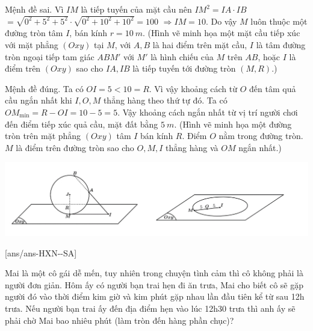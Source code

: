 \begin{ex}
{\begin{listEX}
        \item Mệnh đề sai.
        Vì $IM$ là tiếp tuyến của mặt cầu nên $IM^2 = IA \cdot IB$
        $= \sqrt{0^2+5^2+5^2} \cdot \sqrt{0^2+10^2+10^2} = 100$
        $\Rightarrow IM=10$.
        Do vậy $M$ luôn thuộc một đường tròn tâm $I$, bán kính $r=10~m$.
        (Hình vẽ minh họa một mặt cầu tiếp xúc với mặt phẳng $(Oxy)$ tại $M$, với $A, B$ là hai điểm trên mặt cầu, $I$ là tâm đường tròn ngoại tiếp tam giác $ABM'$ với $M'$ là hình chiếu của $M$ trên $AB$, hoặc $I$ là điểm trên $(Oxy)$ sao cho $IA, IB$ là tiếp tuyến tới đường tròn $(M, R)$.)
        
        \item Mệnh đề đúng.
        Ta có $OI=5 < 10 = R$. Vì vậy khoảng cách từ $O$ đến tâm quả cầu ngắn nhất khi $I, O, M$ thẳng hàng theo thứ tự đó.
        Ta có $OM_{\min} = R - OI = 10-5=5$.
        Vậy khoảng cách ngắn nhất từ vị trí người chơi đến điểm tiếp xúc quả cầu, mặt đất bằng $5~m$.
        (Hình vẽ minh họa một đường tròn trên mặt phẳng $(Oxy)$ tâm $I$ bán kính $R$. Điểm $O$ nằm trong đường tròn. $M$ là điểm trên đường tròn sao cho $O, M, I$ thẳng hàng và $OM$ ngắn nhất.)
    \end{listEX}
    \begin{center}
        \includegraphics[scale=.7]{img/HXN-6.16a}
    \end{center}
    }
\end{ex}
\caukq
{}[ans/ans-HXN-\sode-SA]
% 
 \begin{ex}%
 Mai là một cô gái dễ mến, tuy nhiên trong chuyện tình cảm thì cô không phải là người đơn giản. Hôm ấy có người bạn trai hẹn đi ăn trưa, Mai cho biết cô sẽ gặp người đó vào thời điểm kim giờ và kim phút gặp nhau lần đầu tiên kể từ sau 12h trưa. Nếu người bạn trai ấy đến địa điểm hẹn vào lúc 12h30 trưa thì anh ấy sẽ phải chờ Mai bao nhiêu phút (làm tròn đến hàng phần chục)?
 \end{ex}
 
